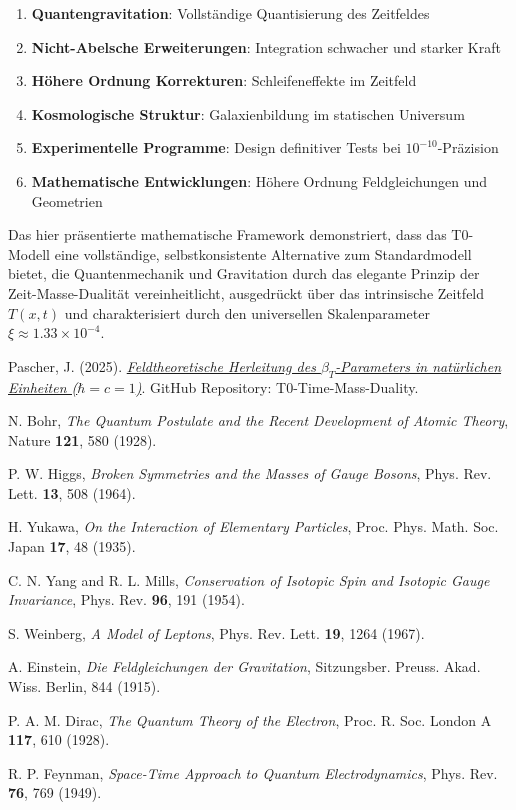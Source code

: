 \documentclass[12pt,a4paper]{article}
\newcommand{\xipar}{\xi}
\theoremstyle{definition}
\theoremstyle{remark}
\begin{document}
	\begin{enumerate}
		\item \textbf{Quantengravitation}: Vollständige Quantisierung des Zeitfeldes
		\item \textbf{Nicht-Abelsche Erweiterungen}: Integration schwacher und starker Kraft
		\item \textbf{Höhere Ordnung Korrekturen}: Schleifeneffekte im Zeitfeld
		\item \textbf{Kosmologische Struktur}: Galaxienbildung im statischen Universum
		\item \textbf{Experimentelle Programme}: Design definitiver Tests bei $10^{-10}$-Präzision
		\item \textbf{Mathematische Entwicklungen}: Höhere Ordnung Feldgleichungen und Geometrien
	\end{enumerate}
	
	Das hier präsentierte mathematische Framework demonstriert, dass das T0-Modell eine vollständige, selbstkonsistente Alternative zum Standardmodell bietet, die Quantenmechanik und Gravitation durch das elegante Prinzip der Zeit-Masse-Dualität vereinheitlicht, ausgedrückt über das intrinsische Zeitfeld $T(x,t)$ und charakterisiert durch den universellen Skalenparameter $\xipar \approx 1.33 \times 10^{-4}$.
	
	\begin{thebibliography}{99}
		
		Pascher, J. (2025). \href{https://github.com/jpascher/T0-Time-Mass-Duality/blob/main/2/pdf/DerivationVonBetaEn.pdf}{\textit{Feldtheoretische Herleitung des $\beta_T$-Parameters in natürlichen Einheiten ($\hbar = c = 1$)}}. GitHub Repository: T0-Time-Mass-Duality.
		
		N. Bohr,
		\textit{The Quantum Postulate and the Recent Development of Atomic Theory},
		Nature \textbf{121}, 580 (1928).
		
		P. W. Higgs,
		\textit{Broken Symmetries and the Masses of Gauge Bosons},
		Phys. Rev. Lett. \textbf{13}, 508 (1964).
		
		H. Yukawa,
		\textit{On the Interaction of Elementary Particles},
		Proc. Phys. Math. Soc. Japan \textbf{17}, 48 (1935).
		
		C. N. Yang and R. L. Mills,
		\textit{Conservation of Isotopic Spin and Isotopic Gauge Invariance},
		Phys. Rev. \textbf{96}, 191 (1954).
		
		S. Weinberg,
		\textit{A Model of Leptons},
		Phys. Rev. Lett. \textbf{19}, 1264 (1967).
		
		A. Einstein,
		\textit{Die Feldgleichungen der Gravitation},
		Sitzungsber. Preuss. Akad. Wiss. Berlin, 844 (1915).
		
		P. A. M. Dirac,
		\textit{The Quantum Theory of the Electron},
		Proc. R. Soc. London A \textbf{117}, 610 (1928).
		
		R. P. Feynman,
		\textit{Space-Time Approach to Quantum Electrodynamics},
		Phys. Rev. \textbf{76}, 769 (1949).
		
	\end{thebibliography}
	
\end{document}
